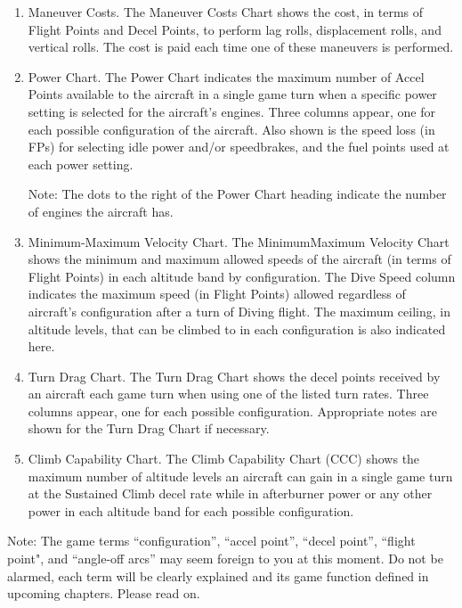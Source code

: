 \begin{enumerate}
    \item Maneuver Costs. The Maneuver Costs Chart shows the cost, in terms of Flight Points and Decel Points, to perform lag rolls, displacement rolls, and vertical rolls. The cost is paid each time one of these maneuvers is performed.

    \item Power Chart. The Power Chart indicates the maximum number of Accel Points available to the aircraft in a single game turn when a specific power setting is selected for the aircraft's engines. Three columns appear, one for each possible configuration of the aircraft. Also shown is the speed loss (in FPs) for selecting idle power and/or speedbrakes, and the fuel points used at each power setting.

    Note: The dots to the right of the Power Chart heading indicate the number of engines the aircraft has.

    \item Minimum-Maximum Velocity Chart. The Minimum­Maximum Velocity Chart shows the minimum and maximum allowed speeds of the aircraft (in terms of Flight Points) in each altitude band by configuration. The Dive Speed column indicates the maximum speed (in Flight Points) allowed regardless of aircraft's configuration after a turn of Diving flight. The maximum ceiling, in altitude levels, that can be climbed to in each configuration is also indicated here.

    \item Turn Drag Chart. The Turn Drag Chart shows the decel points received by an aircraft each game turn when using one of the listed turn rates. Three columns appear, one for each possible configuration. Appropriate notes are shown for the Turn Drag Chart if necessary.

    \item Climb Capability Chart.  The Climb Capability Chart (CCC) shows the maximum number of altitude levels an aircraft can gain in a single game turn at the Sustained Climb decel rate while in afterburner power or any other power in each altitude band for each possible configuration.

\end{enumerate}

Note: The game terms “configuration”, “accel point”, “decel point”, “flight point", and “angle-off arcs” may seem foreign to you at this moment. Do not be alarmed, each term will be clearly explained and its game function defined in upcoming chapters. Please read on.

